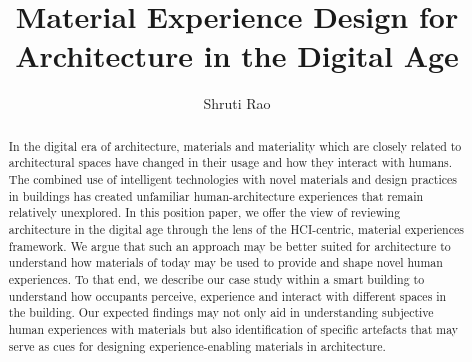 \documentclass[manuscript, anonymous, review]{acmart}
\begin{document}
\title{Material Experience Design for Architecture in the Digital Age}

\author{Shruti Rao}


\renewcommand{\shortauthors}{Rao et al.}

\begin{abstract}


In the digital era of architecture, materials and materiality which are closely related to architectural spaces have changed in their usage and how they interact with humans. The combined use of intelligent technologies with novel materials and design practices in buildings has created unfamiliar human-architecture experiences that remain relatively unexplored. In this position paper, we offer the view of reviewing architecture in the digital age through the lens of the HCI-centric, material experiences framework. We argue that such an approach may be better suited for architecture to understand how materials of today may be used to provide and shape novel human experiences. To that end, we describe our case study within a smart building to understand how occupants perceive, experience and interact with different spaces in the building. Our expected findings may not only aid in understanding subjective human experiences with materials but also identification of specific artefacts that may serve as cues for designing experience-enabling materials in architecture.
\end{abstract}
\end{document}

